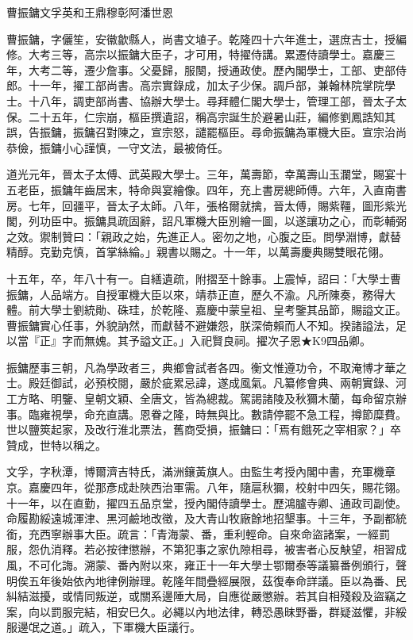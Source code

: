 
\begin{pinyinscope}
曹振鏞文孚英和王鼎穆彰阿潘世恩

曹振鏞，字儷笙，安徽歙縣人，尚書文埴子。乾隆四十六年進士，選庶吉士，授編修。大考三等，高宗以振鏞大臣子，才可用，特擢侍講。累遷侍讀學士。嘉慶三年，大考二等，遷少詹事。父憂歸，服闋，授通政使。歷內閣學士，工部、吏部侍郎。十一年，擢工部尚書。高宗實錄成，加太子少保。調戶部，兼翰林院掌院學士。十八年，調吏部尚書、協辦大學士。尋拜體仁閣大學士，管理工部，晉太子太保。二十五年，仁宗崩，樞臣撰遺詔，稱高宗誕生於避暑山莊，編修劉鳳誥知其誤，告振鏞，振鏞召對陳之，宣宗怒，譴罷樞臣。尋命振鏞為軍機大臣。宣宗治尚恭儉，振鏞小心謹慎，一守文法，最被倚任。

道光元年，晉太子太傅、武英殿大學士。三年，萬壽節，幸萬壽山玉瀾堂，賜宴十五老臣，振鏞年齒居末，特命與宴繪像。四年，充上書房總師傅。六年，入直南書房。七年，回疆平，晉太子太師。八年，張格爾就擒，晉太傅，賜紫韁，圖形紫光閣，列功臣中。振鏞具疏固辭，詔凡軍機大臣別繪一圖，以遂讓功之心，而彰輔弼之效。禦制贊曰：「親政之始，先進正人。密勿之地，心腹之臣。問學淵博，獻替精醇。克勤克慎，首掌絲綸。」親書以賜之。十一年，以萬壽慶典賜雙眼花翎。

十五年，卒，年八十有一。自繕遺疏，附摺至十餘事。上震悼，詔曰：「大學士曹振鏞，人品端方。自授軍機大臣以來，靖恭正直，歷久不渝。凡所陳奏，務得大體。前大學士劉統勛、硃珪，於乾隆、嘉慶中蒙皇祖、皇考鑒其品節，賜謚文正。曹振鏞實心任事，外貌訥然，而獻替不避嫌怨，朕深倚賴而人不知。揆諸謚法，足以當『正』字而無媿。其予謚文正。」入祀賢良祠。擢次子恩★K9四品卿。

振鏞歷事三朝，凡為學政者三，典鄉會試者各四。衡文惟遵功令，不取淹博才華之士。殿廷御試，必預校閱，嚴於疵累忌諱，遂成風氣。凡纂修會典、兩朝實錄、河工方略、明鑒、皇朝文穎、全唐文，皆為總裁。駕謁諸陵及秋獮木蘭，每命留京辦事。臨雍視學，命充直講。恩眷之隆，時無與比。數請停罷不急工程，撙節糜費。世以鹽筴起家，及改行淮北票法，舊商受損，振鏞曰：「焉有餓死之宰相家？」卒贊成，世特以稱之。

文孚，字秋潭，博爾濟吉特氏，滿洲鑲黃旗人。由監生考授內閣中書，充軍機章京。嘉慶四年，從那彥成赴陜西治軍需。八年，隨扈秋獮，校射中四矢，賜花翎。十一年，以在直勤，擢四五品京堂，授內閣侍讀學士。歷鴻臚寺卿、通政司副使。命履勘綏遠城渾津、黑河鹼地改徵，及大青山牧廠餘地招墾事。十三年，予副都統銜，充西寧辦事大臣。疏言：「青海蒙、番，重利輕命。自來命盜諸案，一經罰服，怨仇消釋。若必按律懲辦，不第犯事之家仇隙相尋，被害者心反觖望，相習成風，不可化誨。溯蒙、番內附以來，雍正十一年大學士鄂爾泰等議纂番例頒行，聲明俟五年後始依內地律例辦理。乾隆年間疊經展限，茲復奉命詳議。臣以為番、民糾結滋擾，或情同叛逆，或關系邊陲大局，自應從嚴懲辦。若其自相殘殺及盜竊之案，向以罰服完結，相安巳久。必繩以內地法律，轉恐愚昧野番，群疑滋懼，非綏服邊氓之道。」疏入，下軍機大臣議行。


\end{pinyinscope}
